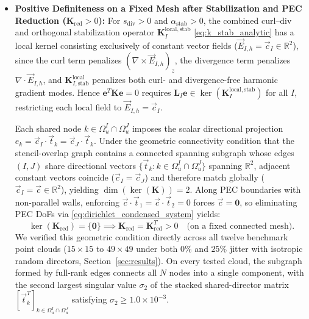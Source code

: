 \documentclass[VANCOUVER,Times1COL]{WileyNJD-v5}
\begin{document}
\begin{itemize}
          On configurations with full coverage ($\Omega_{\mathrm{cov}} = \Omega$, such as regular grids where $\bar{M} \approx \pi\alpha_s^2 \approx 2.01$), Eq.~\eqref{eq:norm_equivalence_multiplicity} establishes global norm equivalence on $\boldsymbol{L}^2(\Omega)$; on perturbed clouds with partial coverage ($\Omega_{\mathrm{cov}} \subset \Omega$), it holds over the covered region $\Omega_{\mathrm{cov}}$.
    \item \textbf{Positive Definiteness on a Fixed Mesh after Stabilization and PEC Reduction ($\mathbf{K}_{\mathrm{red}} > 0$):}
          For $s_{\mathrm{div}} > 0$ and $\alpha_{\mathrm{stab}} > 0$, the combined curl--div and orthogonal stabilization operator $\mathbf{K}_I^{\mathrm{local, stab}}$ \eqref{eq:k_stab_analytic} has a local kernel consisting exclusively of constant vector fields ($\vec{E}_{I, h} = \vec{c}_I \in \mathbb{R}^2$), since the curl term penalizes $(\nabla\times\vec{E}_{I,h})_z$, the divergence term penalizes $\nabla\cdot\vec{E}_{I,h}$, and $\mathbf{K}_{I, \mathrm{stab}}^{\mathrm{local}}$ penalizes both curl- and divergence-free harmonic gradient modes. Hence $\mathbf{e}^T \mathbf{K} \mathbf{e} = 0$ requires $\mathbf{L}_I \mathbf{e} \in \ker(\mathbf{K}_I^{\mathrm{local, stab}})$ for all $I$, restricting each local field to $\vec{E}_{I, h} = \vec{c}_I$.

          Each shared node $k \in \Omega_u^I \cap \Omega_u^J$ imposes the scalar directional projection $e_k = \vec{c}_I \cdot \vec{t}_k = \vec{c}_J \cdot \vec{t}_k$. Under the geometric connectivity condition that the stencil-overlap graph contains a connected spanning subgraph whose edges $(I, J)$ share directional vectors $\{\vec{t}_k : k \in \Omega_u^I \cap \Omega_u^J\}$ spanning $\mathbb{R}^2$, adjacent constant vectors coincide ($\vec{c}_I = \vec{c}_J$) and therefore match globally ($\vec{c}_I = \vec{c} \in \mathbb{R}^2$), yielding $\dim(\ker(\mathbf{K})) = 2$. Along PEC boundaries with non-parallel walls, enforcing $\vec{c} \cdot \vec{t}_1 = \vec{c} \cdot \vec{t}_2 = 0$ forces $\vec{c} = \mathbf{0}$, so eliminating PEC DoFs via \eqref{eq:dirichlet_condensed_system} yields:
          \begin{equation}
              \ker(\mathbf{K}_{\mathrm{red}}) = \{ \mathbf{0} \} \implies \mathbf{K}_{\mathrm{red}} = \mathbf{K}_{\mathrm{red}}^T > 0 \quad \text{(on a fixed connected mesh)}.
              \label{eq:condensed_positive_definite_proof}
          \end{equation}
          We verified this geometric condition directly across all twelve benchmark point clouds ($15\times 15$ to $49\times 49$ under both $0\%$ and $25\%$ jitter with isotropic random directors, Section~\ref{sec:results}). On every tested cloud, the subgraph formed by full-rank edges connects all $N$ nodes into a single component, with the second largest singular value $\sigma_2$ of the stacked shared-director matrix $[\vec{t}_k^T]_{k \in \Omega_u^I \cap \Omega_u^J}$ satisfying $\sigma_2 \ge 1.0 \times 10^{-3}$.
\end{itemize}
\end{document}
